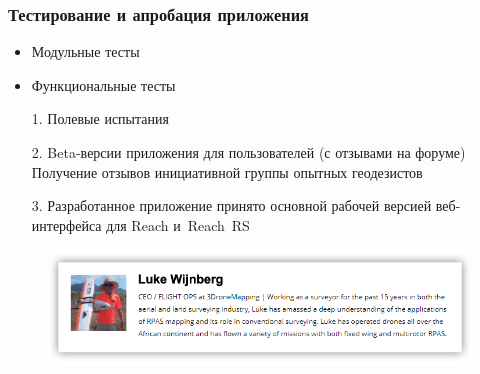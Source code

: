 \documentclass[xetex,с,aspectratio=169]{beamer}
\begin{document}
%
%
\begin{frame}
  \frametitle{Тестирование и апробация приложения}
  
  \large
  
  \begin{itemize}
    \setlength\itemsep{0.5em}
    \item Модульные тесты
    \item Функциональные тесты
  \end{itemize}
  \begin{center}
    \vskip -0.5cm
    \color{ifmoblue}{\rule{.5\textwidth}{0.5pt}}
  \end{center}
  \vskip -0.2cm
  \begin{itemize}
    \setlength\itemsep{0.5em}
    \item[1.] Полевые испытания
    \item[2.] Beta-версии приложения для пользователей (с отзывами на форуме)\\
              Получение отзывов инициативной группы опытных геодезистов
    \item[3.] Разработанное приложение принято основной рабочей версией веб-интерфейса для Reach и~Reach~RS
  \end{itemize}
  \vskip -0.2cm
  \begin{figure}[b]
    \centering
    \includegraphics[width=.5\paperwidth]{../img/presentation/luke_wijnberg}
  \end{figure}
\end{frame}
\end{document}
